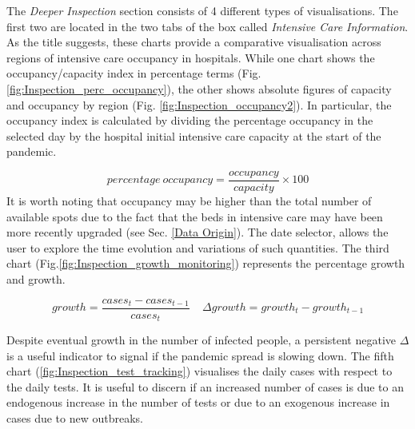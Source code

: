 \documentclass[
12pt, %
a4paper, %
oneside, %
headinclude,footinclude, %
BCOR5mm, %
]{scrartcl}
\begin{document}
The \textit{Deeper Inspection } section consists of 4 different types of visualisations. The first two are located in the two tabs of the box called \textit{Intensive Care Information}. As the title suggests, these charts provide a comparative visualisation across regions of intensive care occupancy in hospitals. While one chart shows the occupancy/capacity index in percentage terms (Fig. \ref{fig:Inspection_perc_occupancy}), the other shows absolute figures of capacity and occupancy by region (Fig. \ref{fig:Inspection_occupancy2}). In particular, the occupancy index is calculated by dividing the percentage occupancy in the selected day by the hospital initial intensive care capacity at the start of the pandemic.

\begin{equation}
percentage~occupancy = \dfrac{occupancy}{capacity} \times 100
\end{equation}
It is worth noting that occupancy may be higher than the total number of available spots due to the fact that the beds in intensive care may have been more recently upgraded (see Sec. \ref{Data Origin}). The date selector, allows the user to explore the time evolution and variations of such quantities. The third chart (Fig.\ref{fig:Inspection_growth_monitoring})  represents the percentage growth and growth.


\begin{equation}
growth = \frac{cases_t - cases_{t-1}}{cases_t} ~~~~~ \Delta growth  = growth_t - growth_{t-1}
\end{equation}

Despite eventual growth in the number of infected people, a persistent negative $\Delta$ is a useful indicator to signal if the pandemic spread is slowing down. The fifth chart (\ref{fig:Inspection_test_tracking}) visualises the daily cases with respect to the daily tests. It is useful to discern if an increased number of cases is due to an endogenous increase in the number of tests or due to an exogenous increase in cases due to new outbreaks.
\end{document}
